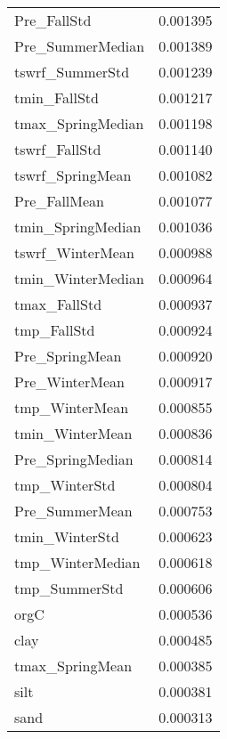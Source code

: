 \begin{tabular}{lr}
Pre_FallStd & 0.001395 \\
Pre_SummerMedian & 0.001389 \\
tswrf_SummerStd & 0.001239 \\
tmin_FallStd & 0.001217 \\
tmax_SpringMedian & 0.001198 \\
tswrf_FallStd & 0.001140 \\
tswrf_SpringMean & 0.001082 \\
Pre_FallMean & 0.001077 \\
tmin_SpringMedian & 0.001036 \\
tswrf_WinterMean & 0.000988 \\
tmin_WinterMedian & 0.000964 \\
tmax_FallStd & 0.000937 \\
tmp_FallStd & 0.000924 \\
Pre_SpringMean & 0.000920 \\
Pre_WinterMean & 0.000917 \\
tmp_WinterMean & 0.000855 \\
tmin_WinterMean & 0.000836 \\
Pre_SpringMedian & 0.000814 \\
tmp_WinterStd & 0.000804 \\
Pre_SummerMean & 0.000753 \\
tmin_WinterStd & 0.000623 \\
tmp_WinterMedian & 0.000618 \\
tmp_SummerStd & 0.000606 \\
orgC & 0.000536 \\
clay & 0.000485 \\
tmax_SpringMean & 0.000385 \\
silt & 0.000381 \\
sand & 0.000313 \\
\bottomrule
\end{tabular}
